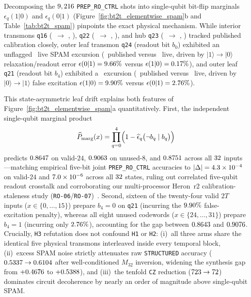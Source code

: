 \documentclass[aps,prx,twocolumn,superscriptaddress,nofootinbib]{revtex4-2}
\begin{document}
Decomposing the $9,216$ \texttt{PREP\_RO\_CTRL} shots into single-qubit bit-flip marginals $\epsilon_q(1|0)$ and $\epsilon_q(0|1)$ (Figure~\ref{fig:bt2t_elementwise_spam}b and Table~\ref{tab:bt2t_spam}) pinpoints the exact physical mechanism. While interior transmons \texttt{q16} (\btQSixteenCalPct\ $\to$ \btQSixteenLivePct, \btQSixteenStaleX), \texttt{q22} (\btQTwentyTwoCalPct\ $\to$ \btQTwentyTwoLivePct, \btQTwentyTwoStaleX), and hub \texttt{q23} (\btQTwentyThreeCalPct\ $\to$ \btQTwentyThreeLivePct, \btQTwentyThreeStaleX) tracked published calibration closely, outer leaf transmon \texttt{q24} (readout bit $b_0$) exhibited an unflagged \btQTwentyFourStaleX\ live SPAM excursion (\btQTwentyFourCalPct\ published versus \btQTwentyFourLivePct\ live, driven by $|1\rangle \to |0\rangle$ relaxation/readout error $\epsilon(0|1) = 9.66\%$ versus $\epsilon(1|0) = 0.17\%$), and outer leaf \texttt{q21} (readout bit $b_4$) exhibited a \btQTwentyOneStaleX\ excursion (\btQTwentyOneCalPct\ published versus \btQTwentyOneLivePct\ live, driven by $|0\rangle \to |1\rangle$ false excitation $\epsilon(1|0) = 9.90\%$ versus $\epsilon(0|1) = 2.76\%$).

This state-asymmetric leaf drift explains both features of Figure~\ref{fig:bt2t_elementwise_spam}a quantitatively. First, the independent single-qubit marginal product
\begin{equation}
  \widehat{P}_{\mathrm{marg}}(x) = \prod_{q=0}^{4} \Bigl(1 - \widehat{\epsilon}_q\bigl(\neg b_q \mid b_q\bigr)\Bigr)
  \label{eq:marginal_product}
\end{equation}
predicts $0.8647$ on valid-$24$, $0.9063$ on unused-$8$, and $0.8751$ across all $32$ inputs---matching empirical five-bit joint \texttt{PREP\_RO\_CTRL} accuracies to $|\Delta| = 4.3 \times 10^{-4}$ on valid-$24$ and $7.0 \times 10^{-6}$ across all $32$ states, ruling out correlated five-qubit readout crosstalk and corroborating our multi-processor Heron~r2 calibration-staleness study (\texttt{RO-06}/\texttt{RO-07})~\cite{DavisRO0607Zenodo2026,DavisTMAP02Zenodo2026}. Second, sixteen of the twenty-four valid $2T$ inputs ($x \in \{0,\dots,15\}$) prepare $b_4 = 0$ on \texttt{q21} (incurring the $9.90\%$ false-excitation penalty), whereas all eight unused codewords ($x \in \{24,\dots,31\}$) prepare $b_4 = 1$ (incurring only $2.76\%$), accounting for the gap between $0.8643$ and $0.9076$. Crucially, \texttt{H3} refutation does not confound \texttt{H1} or \texttt{H2}: (i)~all three arms share the identical five physical transmons interleaved inside every temporal block, (ii)~excess SPAM noise strictly attenuates raw \texttt{STRUCTURED} accuracy ($0.5337 \to 0.6104$ after well-conditioned $M_{32}$ inversion, widening the synthesis gap from $+0.4676$ to $+0.5388$), and (iii)~the tenfold \texttt{CZ} reduction ($723 \to 72$) dominates circuit decoherence by nearly an order of magnitude above single-qubit SPAM.
\end{document}
